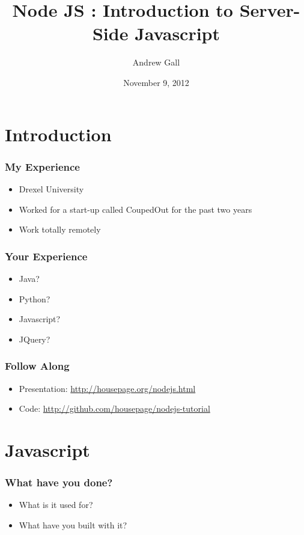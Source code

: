 \documentclass[ignorenonframetext,]{beamer}
\title{Node JS : Introduction to Server-Side Javascript}
\author{Andrew Gall}
\date{November 9, 2012}
\begin{document}
\frame{\titlepage}

\section{Introduction}

\begin{frame}\frametitle{My Experience}

\begin{itemize}
\item
  Drexel University
\item
  Worked for a start-up called CoupedOut for the past two years
\item
  Work totally remotely
\end{itemize}
\end{frame}

\begin{frame}\frametitle{Your Experience}

\begin{itemize}
\item
  Java?
\item
  Python?
\item
  Javascript?
\item
  JQuery?
\end{itemize}
\end{frame}

\begin{frame}\frametitle{Follow Along}

\begin{itemize}
\item
  Presentation:
  \href{http://housepage.org/nodejs.html}{http://housepage.org/nodejs.html}
\item
  Code:
  \href{http://github.com/housepage/nodejs-tutorial}{http://github.com/housepage/nodejs-tutorial}
\end{itemize}
\end{frame}

\section{Javascript}

\begin{frame}\frametitle{What have you done?}

\begin{itemize}[<+->]
\item
  What is it used for?
\item
  What have you built with it?
\end{itemize}
\end{frame}
\end{document}
